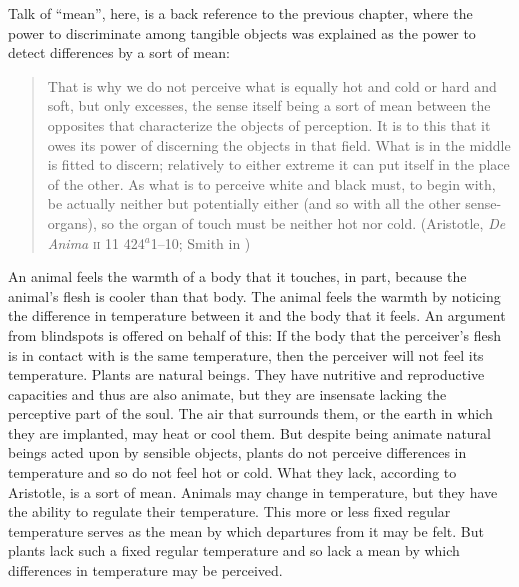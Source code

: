 Talk of ``mean'', here, is a back reference to the previous chapter, where the power to discriminate among tangible objects was explained as the power to detect differences by a sort of mean:
\begin{quote}
	That is why we do not perceive what is equally hot and cold or hard and soft, but only excesses, the sense itself being a sort of mean between the opposites that characterize the objects of perception. It is to this that it owes its power of discerning the objects in that field. What is in the middle is fitted to discern; relatively to either extreme it can put itself in the place of the other. As what is to perceive white and black must, to begin with, be actually neither but potentially either (and so with all the other sense-organs), so the organ of touch must be neither hot nor cold. (Aristotle, \emph{De Anima} \textsc{ii} 11 424\( ^{a} \)1--10; Smith in \citealt[42]{Barnes:1984uq})
\end{quote}
An animal feels the warmth of a body that it touches, in part, because the animal's flesh is cooler than that body. The animal feels the warmth by noticing the difference in temperature between it and the body that it feels. An argument from blindspots is offered on behalf of this: If the body that the perceiver's flesh is in contact with is the same temperature, then the perceiver will not feel its temperature. Plants are natural beings. They have nutritive and reproductive capacities and thus are also animate, but they are insensate lacking the perceptive part of the soul. The air that surrounds them, or the earth in which they are implanted, may heat or cool them. But despite being animate natural beings acted upon by sensible objects, plants do not perceive differences in temperature and so do not feel hot or cold. What they lack, according to Aristotle, is a sort of mean. Animals may change in temperature, but they have the ability to regulate their temperature. This more or less fixed regular temperature serves as the mean by which departures from it may be felt. But plants lack such a fixed regular temperature and so lack a mean by which differences in temperature may be perceived.


